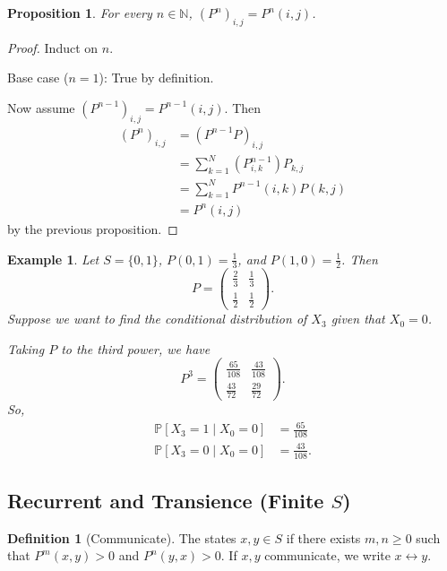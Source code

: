 \documentclass{tufte-handout}
\newcommand*\N{\mathbb{N}}
\renewcommand*\P{\mathbb{P}}
\newtheorem{ex}[thm]{Example}
\newtheorem{prop}[thm]{Proposition}
\theoremstyle{definition}
\newtheorem{defn}[thm]{Definition}
\begin{document}
\begin{prop}
	For every $n \in \N$, $(P^n)_{i,j} = P^n(i,j)$.
\end{prop}

\begin{proof}
	Induct on $n$.

	Base case ($n=1$): True by definition.
	
	Now assume $(P^{n-1})_{i,j} = P^{n-1}(i,j)$. Then
	\begin{align*}
		\left( P^n \right)_{i,j} &=  \left( P^{n-1}P \right)_{i,j} \\
		&= \sum\limits_{k=1}^{N} \left( P^{n-1}_{i,k} \right) P_{k,j} \\
		&= \sum\limits_{k=1}^{N} P^{n-1}(i,k) P(k,j) \\
		&= P^n(i,j)
	\end{align*} by the previous proposition.
\end{proof}

\begin{ex}
	Let $S = \{0,1\}$, $P(0,1) = \frac{1}{3}$, and $P(1,0) = \frac{1}{2}$. Then \[
		P = \begin{pmatrix}
		\frac{2}{3} & \frac{1}{3} \\
		\frac{1}{2} & \frac{1}{2}
		\end{pmatrix} 
	.\] Suppose we want to find the conditional distribution of $X_3$ given that $X_0 = 0$.

	Taking $P$ to the third power, we have \[
		P^3 = \begin{pmatrix}
		\frac{65}{108} & \frac{43}{108} \\
		\frac{43}{72} & \frac{29}{72}
		\end{pmatrix} 
	.\] So,
	\begin{align*}
		\P\left[X_3 = 1 \mid X_0 = 0\right]  &= \frac{65}{108} \\
		\P\left[X_3 = 0 \mid X_0 = 0\right] &= \frac{43}{108}
	.\end{align*}
\end{ex}

\subsection{Recurrent and Transience (Finite $S$)}

\begin{defn}[Communicate]
	The states $x,y \in S$ if there exists $m,n \ge 0$ such that $P^m(x,y) > 0$ and $P^n(y,x) > 0$. If $x,y$ communicate, we write $x \leftrightarrow y$.
\end{defn}
\end{document}

